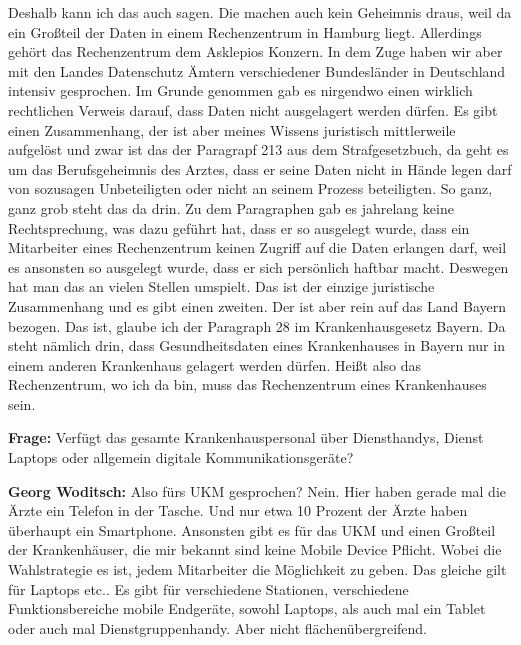 Deshalb kann ich das auch sagen. Die machen auch kein Geheimnis draus, weil da ein Großteil der Daten in einem Rechenzentrum in Hamburg liegt. Allerdings gehört das Rechenzentrum dem Asklepios Konzern. In dem Zuge haben wir aber mit den Landes Datenschutz Ämtern verschiedener Bundesländer in Deutschland intensiv gesprochen. Im Grunde genommen gab es nirgendwo einen wirklich rechtlichen Verweis darauf, dass Daten nicht ausgelagert werden dürfen. Es gibt einen Zusammenhang, der ist aber meines Wissens juristisch mittlerweile aufgelöst und zwar ist das der Paragrapf 213 aus dem Strafgesetzbuch, da geht es um das Berufsgeheimnis des Arztes, dass er seine Daten nicht in Hände legen darf von sozusagen Unbeteiligten oder nicht an seinem Prozess beteiligten. So ganz, ganz grob steht das da drin. Zu dem Paragraphen gab es jahrelang keine Rechtsprechung, was dazu geführt hat, dass er so ausgelegt wurde, dass ein Mitarbeiter eines Rechenzentrum keinen Zugriff auf die Daten erlangen darf, weil es ansonsten so ausgelegt wurde, dass er sich persönlich haftbar macht. Deswegen hat man das an vielen Stellen umspielt. Das ist der einzige juristische Zusammenhang und es gibt einen zweiten. Der ist aber rein auf das Land Bayern bezogen. Das ist, glaube ich der Paragraph 28 im Krankenhausgesetz Bayern. Da steht nämlich drin, dass Gesundheitsdaten eines Krankenhauses in Bayern nur in einem anderen Krankenhaus gelagert werden dürfen. Heißt also das Rechenzentrum, wo ich da bin, muss das Rechenzentrum eines Krankenhauses sein.

\textbf{Frage: } Verfügt das gesamte Krankenhauspersonal über Diensthandys,  Dienst Laptops oder allgemein digitale Kommunikationsgeräte?

\textbf{Georg Woditsch: } Also fürs UKM gesprochen? Nein. Hier haben gerade mal die Ärzte ein Telefon in der Tasche. Und nur etwa 10 Prozent der Ärzte haben überhaupt ein Smartphone.
Ansonsten gibt es für das UKM und einen Großteil der Krankenhäuser, die mir bekannt sind keine Mobile Device Pflicht. Wobei die Wahlstrategie es ist, jedem Mitarbeiter die Möglichkeit zu geben. Das gleiche gilt für Laptops etc.. Es gibt für verschiedene Stationen, verschiedene Funktionsbereiche mobile Endgeräte, sowohl Laptops, als auch mal ein Tablet oder auch mal Dienstgruppenhandy. Aber nicht flächenübergreifend.

